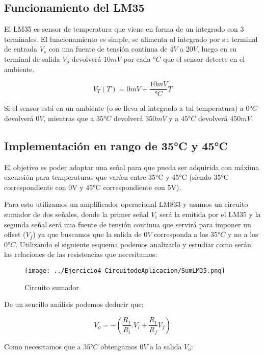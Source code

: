 \subsection{Funcionamiento del LM35}
El LM35 es sensor de temperatura que viene en forma de un integrado con 3 terminales. El funcionamiento es simple, se alimenta al integrado por su terminal de entrada $V_s$ con una fuente de tensión continua de $4V$ a $20V$, luego en su terminal de salida $V_o$ devolverá $10mV$ por cada $°C$ que el sensor detecte en el ambiente.

\begin{equation}
    V_T(T) = 0mV + \frac{10 mV}{°C} T
\end{equation}


Si el sensor está en un ambiente (o se lleva al integrado a tal temperatura) a $0°C$ devolverá $0V$, mientras que a $35°C$ devolverá $350mV$ y a $45°C$ devolverá $450mV$.



\subsection{Implementación en rango de 35°C y 45°C}

El objetivo es poder adaptar una señal para que pueda ser adquirida con máxima excursión para temperaturas que varíen entre 35°C y 45°C (siendo 35°C correspondiente con 0V y 45°C correspondiente con 5V).

Para esto utilizamos un amplificador operacional LM833 y usamos un circuito sumador de dos señales, donde la primer señal $V_i$ será la emitida por el LM35 y la segunda señal será una fuente de tensión continua que servirá para imponer un offset ($V_f$) ya que buscamos que la salida de $0V$ corresponda a los $35°C$ y no a los $0°C$. Utilizando el siguiente esquema podemos analizarlo y estudiar como serán las relaciones de las resistencias que necesitamos:

\begin{figure}[H]
    \centering
    \texttt{[image: ../Ejercicio4-CircuitodeAplicacion/SumLM35.png]}
    \caption{Circuito sumador}
\end{figure}

De un sencillo análisis podemos deducir que:

\begin{equation}
    V_o = -(\frac{R_1}{R_i}.V_i + \frac{R_1}{R_f} V_f)
\end{equation}

Como necesitamos que a $35°C$ obtengamos $0V$ a la salida $V_o$:

